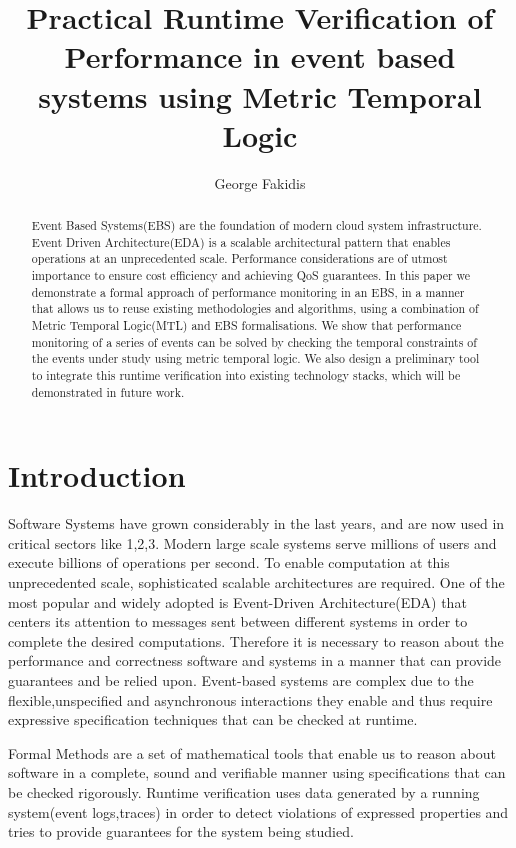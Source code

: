 \documentclass[twocolumn]{article}
\title{Practical Runtime Verification of Performance in event based systems using Metric Temporal Logic}
\author{George Fakidis}
\begin{document}
\maketitle
\begin{abstract}
	Event Based Systems(EBS) are the foundation of modern cloud system infrastructure. Event Driven Architecture(EDA) is a scalable architectural pattern that enables operations at an unprecedented scale. Performance considerations are of utmost importance to ensure cost efficiency and achieving QoS guarantees.
	In this paper we demonstrate a formal approach of performance monitoring in an EBS, in a manner that allows us to reuse existing methodologies and algorithms, using a combination of Metric Temporal Logic(MTL) and EBS formalisations.
	We show that performance monitoring of a series of events can be solved by checking the temporal constraints of the events under study using metric temporal logic.
	We also design a preliminary tool to integrate this runtime verification into existing technology stacks, which will be demonstrated in future work.
\end{abstract}


\section{Introduction}

Software Systems have grown considerably in the last years, and are now used in critical sectors like 1,2,3.
Modern large scale systems serve millions of users and execute billions of operations per second.
To enable computation at this unprecedented scale, sophisticated scalable architectures are required.
One of the most popular and widely adopted is Event-Driven Architecture(EDA) that centers its attention to messages sent between different systems in order to complete the desired computations.
Therefore it is necessary to reason about the performance and correctness software and systems in a manner that can provide guarantees and be relied upon. Event-based systems are complex due to the flexible,unspecified and asynchronous interactions they enable and thus require expressive specification techniques that can be checked at runtime.
\par
Formal Methods are a set of mathematical tools that enable us to reason about software in a complete, sound and verifiable manner using specifications that can be checked rigorously. Runtime verification uses data generated by a running system(event logs,traces) in order to detect violations of expressed properties and tries to provide guarantees for the system being studied.
\end{document}

